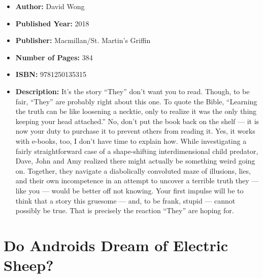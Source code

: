 \documentclass{tufte-handout}
\begin{document}
\begin{itemize}
    \item[] \textbf{Author:} David Wong
    \item[] \textbf{Published Year:} 2018
    \item[] \textbf{Publisher:} Macmillan/St. Martin's Griffin
    \item[] \textbf{Number of Pages:} 384      
    \item[] \textbf{ISBN:} 9781250135315
    \item[] \textbf{Description:} It's the story ``They'' don't want you to read. Though, to be fair, ``They'' are probably right about this one. To quote the Bible, ``Learning the truth can be like loosening a necktie, only to realize it was the only thing keeping your head attached.'' No, don't put the book back on the shelf --- it is now your duty to purchase it to prevent others from reading it. Yes, it works with e-books, too, I don't have time to explain how. While investigating a fairly straightforward case of a shape-shifting interdimensional child predator, Dave, John and Amy realized there might actually be something weird going on. Together, they navigate a diabolically convoluted maze of illusions, lies, and their own incompetence in an attempt to uncover a terrible truth they --- like you --- would be better off not knowing. Your first impulse will be to think that a story this gruesome --- and, to be frank, stupid --- cannot possibly be true. That is precisely the reaction ``They'' are hoping for.
\end{itemize}

\section*{Do Androids Dream of Electric Sheep?}
\end{document}
